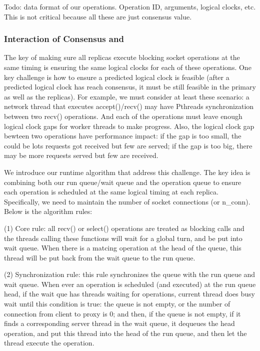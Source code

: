 Todo: data format of our operations. Operation ID, arguments, logical clocks, 
etc. This is not critical because all these are just \paxos consensus value.

\subsubsection{Interaction of Consensus and \smt} \label{sec:rep-interface}

The key of making sure all replicas execute blocking socket operations at the 
same timing is ensuring the same logical clocks for each of these operations. 
One key challenge is how to ensure a predicted logical clock is 
feasible (\ie after a predicted logical clock has reach consensus, it must be 
still feasible in the primary as well as the replicas). For example, we must 
consider at least these scenario: a network thread that executes 
accept()/recv() may have Pthreads synchronization between two recv() operations.
And each of the \paxos operations must leave enough logical clock gaps for 
worker threads to make progress. Also, the logical clock gap bewteen two \paxos 
operations have performance impact: if the gap is too small, the could be lots 
requests got received but few are served; if the gap is too big, there may be 
more requests served but few are received.

We introduce our runtime algorithm that address this challenge. The key idea is 
combining both our \smt run queue/wait queue and the \paxos operation queue to 
ensure each \paxos operation is scheduled at the same logical timing at each 
replica. Specifically, we need to maintain %
the number of socket connections (or n\_conn). Below is the 
algorithm rules:

(1) Core rule: all recv() or select() operations are treated as blocking calls and the 
threads calling these functions will wait for a global \smt turn, and be put into wait 
queue. When there is a matcing \paxos operation at the head of the \paxos 
queue, this thread will be put back from the wait queue to the run queue.

(2) Synchronization rule: this rule synchronizes the \paxos queue with the 
\smt run queue and wait queue. When ever an operation is scheduled (and executed) at the \smt run queue 
head, if the wait que has threads waiting for \paxos operations, current thread does busy wait until
this condition is true: the \paxos queue is not empty, 
or the number of connection from client to proxy is 0; and then, if the \paxos 
queue is not empty, if it finds a 
corresponding server thread in the wait queue, it dequeues the head \paxos operation, 
and put this thread into the head of the run 
queue, and then let the thread execute the \paxos operation. 

